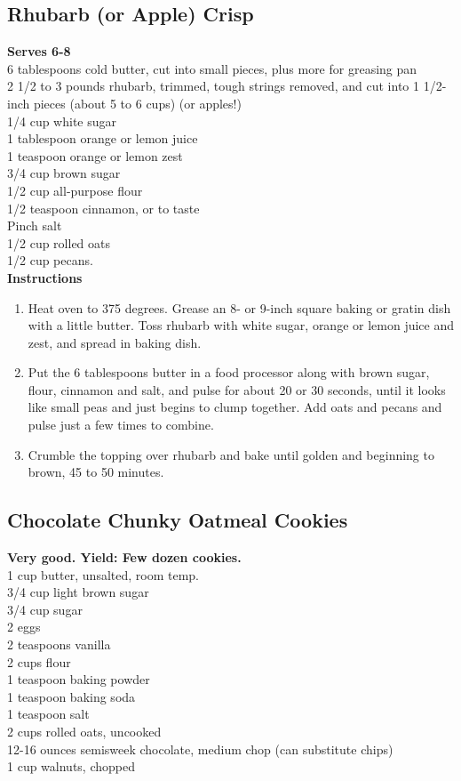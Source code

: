 \documentclass{article}
\numberwithin{figure}{section}
\numberwithin{equation}{section}
\begin{document}
\pagebreak
\subsection{Rhubarb (or Apple) Crisp}
{\bf Serves 6-8}\\
6 tablespoons cold butter, cut into small pieces, plus more for greasing pan\\
2 1/2 to 3 pounds rhubarb, trimmed, tough strings removed, and cut into 1 1/2-inch pieces (about 5 to 6 cups) (or apples!)\\
1/4 cup white sugar\\
1 tablespoon orange or lemon juice\\
1 teaspoon orange or lemon zest\\
3/4 cup brown sugar\\
1/2 cup all-purpose flour\\
1/2 teaspoon cinnamon, or to taste\\
Pinch salt\\
1/2 cup rolled oats\\
1/2 cup pecans.\\

{\bf Instructions}
\begin{enumerate}
\item Heat oven to 375 degrees. Grease an 8- or 9-inch square baking or gratin dish with a little butter. Toss rhubarb with white sugar, orange or lemon juice and zest, and spread in baking dish.
\item Put the 6 tablespoons butter in a food processor along with brown sugar, flour, cinnamon and salt, and pulse for about 20 or 30 seconds, until it looks like small peas and just begins to clump together. Add oats and pecans and pulse just a few times to combine.
\item Crumble the topping over rhubarb and bake until golden and beginning to brown, 45 to 50 minutes.
\end{enumerate}


\pagebreak
\subsection{Chocolate Chunky Oatmeal Cookies}
{\bf Very good. Yield: Few dozen cookies.}\\
1 cup butter, unsalted, room temp.\\
3/4 cup light brown sugar\\
3/4 cup sugar\\
2 eggs\\
2 teaspoons vanilla\\
2 cups flour\\
1 teaspoon baking powder\\
1 teaspoon baking soda\\
1 teaspoon salt\\
2 cups rolled oats, uncooked\\
12-16 ounces semisweek chocolate, medium chop (can substitute chips)\\
1 cup walnuts, chopped\\
\end{document}
